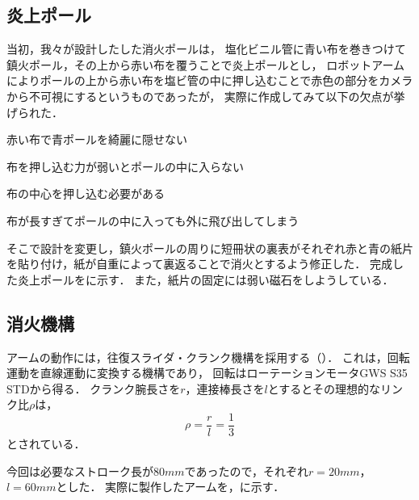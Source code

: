 \documentclass[11pt,a4]{jsarticle}
\begin{document}

  \subsection{炎上ポール}
    当初，我々が設計したした消火ポールは，
    塩化ビニル管に青い布を巻きつけて鎮火ポール，その上から赤い布を覆うことで炎上ポールとし，
    ロボットアームによりポールの上から赤い布を塩ビ管の中に押し込むことで赤色の部分をカメラから不可視にするというものであったが，
    実際に作成してみて以下の欠点が挙げられた．
    \begin{description}
      \item 赤い布で青ポールを綺麗に隠せない
      \item 布を押し込む力が弱いとポールの中に入らない
      \item 布の中心を押し込む必要がある
      \item 布が長すぎてポールの中に入っても外に飛び出してしまう
    \end{description}
    そこで設計を変更し，鎮火ポールの周りに短冊状の裏表がそれぞれ赤と青の紙片を貼り付け，紙が自重によって裏返ることで消火とするよう修正した．
    完成した炎上ポールをに示す．
    また，紙片の固定には弱い磁石をしようしている．


  \subsection{消火機構}  %

    アームの動作には，往復スライダ・クランク機構を採用する（）．
    これは，回転運動を直線運動に変換する機構であり，
    回転はローテーションモータGWS S35 STDから得る．
    クランク腕長さを$r$，連接棒長さを$l$とするとその理想的なリンク比$\rho$は，
    \begin{equation}
      \rho = \frac{r}{l}=\frac{1}{3}
    \end{equation}
    とされている．

    今回は必要なストローク長が$80\unit{mm}$であったので，それぞれ$r=20\unit{mm}$，$l=60\unit{mm}$とした．
    実際に製作したアームを，に示す．
\end{document}
